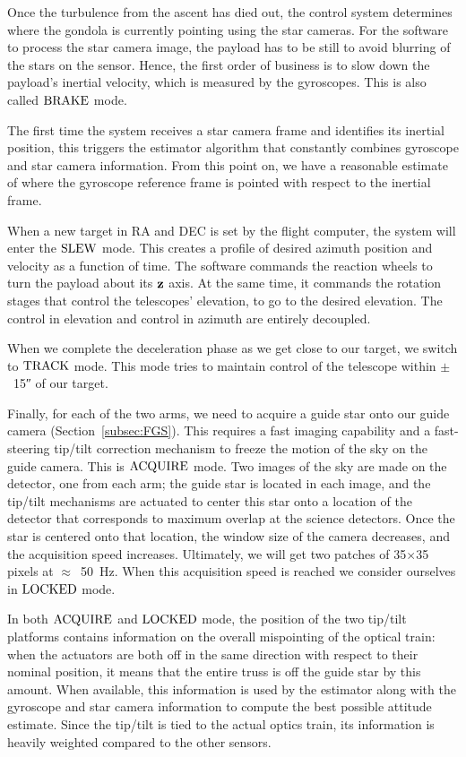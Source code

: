 Once the turbulence from the ascent has died out, the control system determines where the gondola is currently pointing using the star cameras. For the software to process the star camera image, the payload has to be still to avoid blurring of the stars on the sensor. Hence, the first order of business is to slow down the payload's inertial velocity, which is measured by the gyroscopes. This is also called $\textrm{BRAKE}$ mode.

The first time the system receives a star camera frame and identifies its inertial position, this triggers the estimator algorithm that constantly combines gyroscope and star camera information. From this point on, we have a reasonable estimate of where the gyroscope reference frame is pointed with respect to the inertial frame. 

When a new target in RA and DEC is set by the flight computer, the system will enter the $\textrm{SLEW}$ mode. This creates a profile of desired azimuth position and velocity as a function of time. The software commands the reaction wheels to turn the payload about its $\textrm{\textbf{z}}$ axis. At the same time, it commands the rotation stages that control the telescopes' elevation, to go to the desired elevation. The control in elevation and control in azimuth are entirely decoupled.

When we complete the deceleration phase as we get close to our target, we switch to $\textrm{TRACK}$ mode. This mode tries to maintain control of the telescope within $\pm$~\ang{;;15} of our target.

Finally, for each of the two arms, we need to acquire a guide star onto our guide camera (Section~\ref{subsec:FGS}). This requires a fast imaging capability and a fast-steering tip/tilt correction mechanism to freeze the motion of the sky on the guide camera. This is $\textrm{ACQUIRE}$ mode. Two images of the sky are made on the detector, one from each arm; the guide star is located in each image, and the tip/tilt mechanisms are actuated to center this star onto a location of the detector that corresponds to maximum overlap at the science detectors. Once the star is centered onto that location, the window size of the camera decreases, and the acquisition speed increases. Ultimately, we will get two patches of 35$\times$35 pixels at $\approx$~\SI{50}{\hertz}. When this acquisition speed is reached we consider ourselves in $\textrm{LOCKED}$ mode.

In both $\textrm{ACQUIRE}$ and $\textrm{LOCKED}$ mode, the position of the two tip/tilt platforms contains information on the overall mispointing of the optical train: when the actuators are both off in the same direction with respect to their nominal position, it means that the entire truss is off the guide star by this amount. When available, this information is used by the estimator along with the gyroscope and star camera information to compute the best possible attitude estimate. Since the tip/tilt is tied to the actual optics train, its information is heavily weighted compared to the other sensors. 

